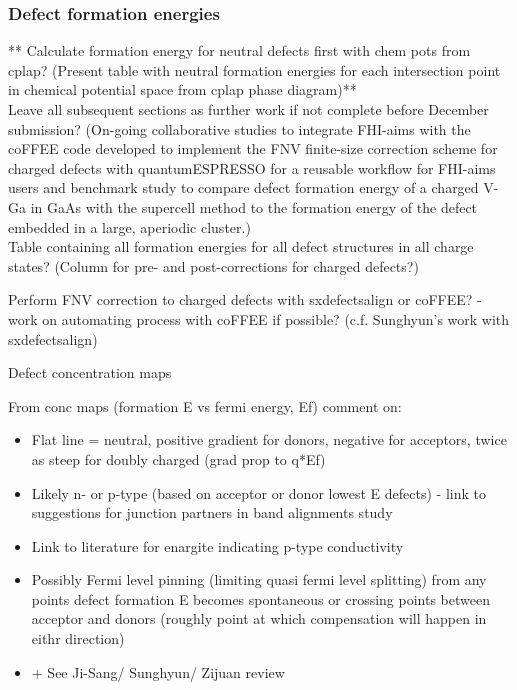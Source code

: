 \documentclass[11pt, twoside]{report}
\begin{document}
\subsubsection{Defect formation energies}

** Calculate formation energy for neutral defects first with chem pots from cplap? (Present table with neutral formation energies for each intersection point in chemical potential space from cplap phase diagram)**\\

Leave all subsequent sections as further work if not complete before December submission? (On-going collaborative studies to integrate FHI-aims with the coFFEE code developed to implement the FNV finite-size correction scheme for charged defects with quantumESPRESSO for a reusable workflow for FHI-aims users and benchmark study to compare defect formation energy of a charged V-Ga in GaAs with the supercell method to the formation energy of the defect embedded in a large, aperiodic cluster.)\\ 

Table containing all formation energies for all defect structures in all charge states? (Column for pre- and post-corrections for charged defects?)

Perform FNV correction to charged defects with sxdefectsalign or coFFEE? - work on automating process with coFFEE if possible? (c.f. Sunghyun's work with sxdefectsalign)

Defect concentration maps

From conc maps (formation E vs fermi energy, Ef) comment on:
\begin{itemize}
\item Flat line = neutral, positive gradient for donors, negative for acceptors, twice as steep for doubly charged (grad prop to q*Ef)
\item Likely n- or p-type (based on acceptor or donor lowest E defects) - link to suggestions for junction partners in band alignments study
\item Link to literature for enargite indicating p-type conductivity
\item Possibly Fermi level pinning (limiting quasi fermi level splitting) from any points defect formation E becomes spontaneous or crossing points between acceptor and donors (roughly point at which compensation will happen in eithr direction)
\item + See Ji-Sang/ Sunghyun/ Zijuan review
\end{itemize}
\end{document}
